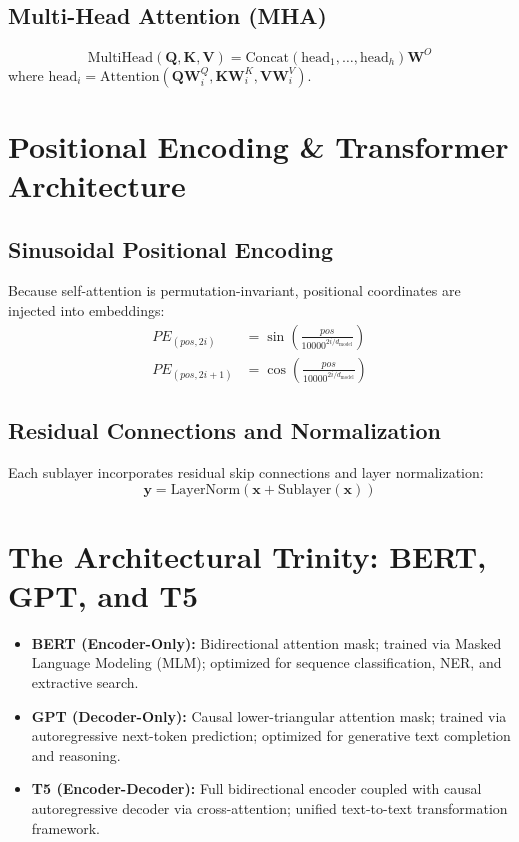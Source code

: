 \documentclass[11pt,a4paper]{article}
\begin{document}
\subsection{Multi-Head Attention (MHA)}
\begin{equation}
\text{MultiHead}(\mathbf{Q}, \mathbf{K}, \mathbf{V}) = \text{Concat}(\text{head}_1, \dots, \text{head}_h)\mathbf{W}^O
\end{equation}
where $\text{head}_i = \text{Attention}(\mathbf{Q}\mathbf{W}_i^Q, \mathbf{K}\mathbf{W}_i^K, \mathbf{V}\mathbf{W}_i^V)$.

\section{Positional Encoding \& Transformer Architecture}
\subsection{Sinusoidal Positional Encoding}
Because self-attention is permutation-invariant, positional coordinates are injected into embeddings:
\begin{align}
PE_{(pos, 2i)} &= \sin\left(\frac{pos}{10000^{2i/d_{\text{model}}}}\right) \\
PE_{(pos, 2i+1)} &= \cos\left(\frac{pos}{10000^{2i/d_{\text{model}}}}\right)
\end{align}

\subsection{Residual Connections and Normalization}
Each sublayer incorporates residual skip connections and layer normalization:
\begin{equation}
\mathbf{y} = \text{LayerNorm}(\mathbf{x} + \text{Sublayer}(\mathbf{x}))
\end{equation}

\section{The Architectural Trinity: BERT, GPT, and T5}
\begin{itemize}
    \item \textbf{BERT (Encoder-Only):} Bidirectional attention mask; trained via Masked Language Modeling (MLM); optimized for sequence classification, NER, and extractive search.
    \item \textbf{GPT (Decoder-Only):} Causal lower-triangular attention mask; trained via autoregressive next-token prediction; optimized for generative text completion and reasoning.
    \item \textbf{T5 (Encoder-Decoder):} Full bidirectional encoder coupled with causal autoregressive decoder via cross-attention; unified text-to-text transformation framework.
\end{itemize}
\end{document}
